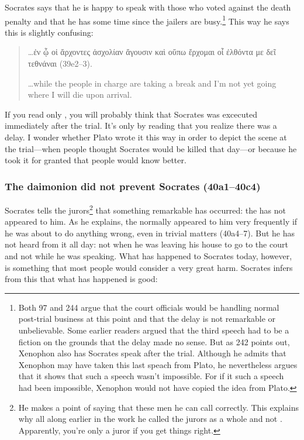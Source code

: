 \documentclass[11pt]{article}
\begin{document}
Socrates says that he is happy to speak with those who voted against the death penalty and that he has some time since the jailers are busy.\footnote{Both \citet{adam1914} 97 and \citet{burnet1924} 244 argue that the court officials would be handling normal post-trial business at this point and that the delay is not remarkable or unbelievable.  Some earlier readers argued that the third speech had to be a fiction on the grounds that the delay made no sense.  But as \citet{burnet1924} 242 points out, Xenophon also has Socrates speak after the trial.  Although he admits that Xenophon may have taken this last speach from Plato, he nevertheless argues that it shows that such a speech wasn't impossible.  For if it such a speech had been impossible, Xenophon would not have copied the idea from Plato.}  This way he says this is slightly confusing:

\begin{quote}
    \dots {\g ἐν ᾧ οἱ ἄρχοντες ἀσχολίαν ἄγουσιν καὶ οὔπω ἔρχομαι οἷ ἐλθόντα με δεῖ τεθνάναι} (39e2--3).

    \dots while the people in charge are taking a break and I'm not yet going where I will die upon arrival.
\end{quote}

If you read only , you will probably think that Socrates was excecuted immediately after the trial.  It's only by reading  that you realize there was a delay.  I wonder whether Plato wrote it this way in order to depict the scene at the trial---when people thought Socrates would be killed that day---or because he took it for granted that people would know better.

\subsubsection{The daimonion did not prevent Socrates (40a1--40c4)}

Socrates tells the jurors\footnote{He makes a point of saying that these men he can call  correctly.  This explains why all along earlier in the work he called the jurors as a whole  and not .  Apparently, you're only a juror if you get things right.} that something remarkable has occurred: the  has not appeared to him.  As he explains, the  normally appeared to him very frequently if he was about to do anything wrong, even in trivial matters (40a4--7).  But he has not heard from it all day: not when he was leaving his house to go to the court and not while he was speaking.  What has happened to Socrates today, however, is something that most people would consider a very great harm.  Socrates infers from this that what has happened is good:
\end{document}
